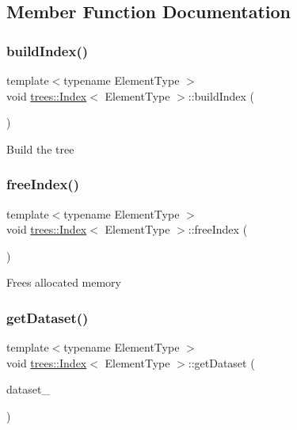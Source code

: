 \subsection{Member Function Documentation}
\mbox{\label{classtrees_1_1_index_a893641c30781d8d75b4e22135f0cbd3e}} 
\subsubsection{\texorpdfstring{build\+Index()}{buildIndex()}}
{\footnotesize\ttfamily template$<$typename Element\+Type $>$ \\
void \hyperlink{classtrees_1_1_index}{trees\+::\+Index}$<$ Element\+Type $>$\+::build\+Index (\begin{DoxyParamCaption}{ }\end{DoxyParamCaption})\hspace{0.3cm}{\ttfamily [inline]}}

Build the tree \mbox{\label{classtrees_1_1_index_a3bbc8a66a33309b8f2f320d726ecabc9}} 
\subsubsection{\texorpdfstring{free\+Index()}{freeIndex()}}
{\footnotesize\ttfamily template$<$typename Element\+Type $>$ \\
void \hyperlink{classtrees_1_1_index}{trees\+::\+Index}$<$ Element\+Type $>$\+::free\+Index (\begin{DoxyParamCaption}{ }\end{DoxyParamCaption})\hspace{0.3cm}{\ttfamily [inline]}}

Frees allocated memory \mbox{\label{classtrees_1_1_index_a56f07dc136d2fff0fc81633cd9bb78fb}} 
\subsubsection{\texorpdfstring{get\+Dataset()}{getDataset()}}
{\footnotesize\ttfamily template$<$typename Element\+Type $>$ \\
void \hyperlink{classtrees_1_1_index}{trees\+::\+Index}$<$ Element\+Type $>$\+::get\+Dataset (\begin{DoxyParamCaption}\item[{\hyperlink{classtrees_1_1_matrix}{Matrix}$<$ Element\+Type $>$ \&}]{dataset\+\_\+ }\end{DoxyParamCaption})\hspace{0.3cm}{\ttfamily [inline]}}

